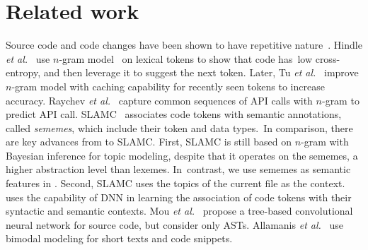 \section{Related work}
\label{related}




 Source code and code changes
have been shown to have repetitive
nature~\cite{fse14-barr,gabel-fse10,natural,semdiff}. 
%
%
Hindle {\em et al.}~\cite{natural} use $n$-gram model~\cite{manning99}
on lexical tokens to show that code has~low cross-entropy, and then
leverage it to suggest the next token. Later, Tu {\em et
  al.}~\cite{tu-fse14} improve $n$-gram model with caching capability
for recently seen tokens to increase 
accuracy. Raychev {\em et al.}~\cite{ethz-pldi14} capture common
sequences of API calls with $n$-gram to predict API call.
%
SLAMC~\cite{fse13} associates code tokens with
semantic annotations, called {\em sememes}, which include their token
and data types.~In comparison, there are key advances from {\tool} to
SLAMC. First, SLAMC is still based on $n$-gram with Bayesian
inference for topic modeling, despite that it operates on the sememes,
a higher abstraction level than lexemes.
In~contrast, we use sememes as semantic features in
{\tool}. Second, SLAMC uses the topics of the current file as the
context.
{\tool} uses the capability of DNN in learning the association of code
tokens with their syntactic and semantic contexts.
Mou {\em et al.}~\cite{tbcnn14} propose a
tree-based convolutional neural network for source code, but
consider only ASTs. Allamanis {\em et al.}~\cite{bimodal15} use bimodal
modeling for short texts and code snippets.

